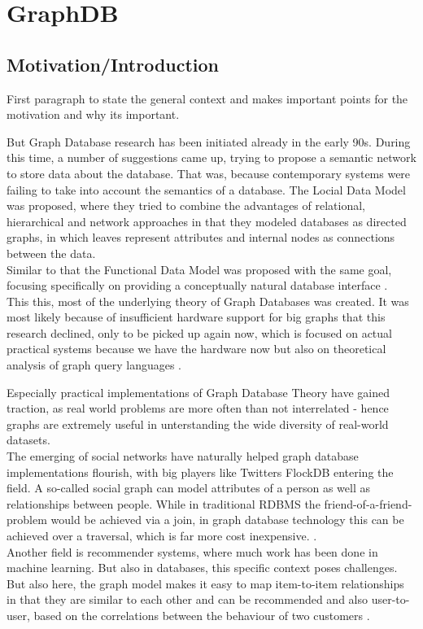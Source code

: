 \chapter{GraphDB}

\section{Motivation/Introduction}
First paragraph to state the general context and makes important points for the motivation and why its important.

But Graph Database research has been initiated already in the early 90s. During this time, a number of suggestions came up, trying to  propose a semantic network to store data about the database. That was, because contemporary systems were failing to take into account the semantics of a database.
The Locial Data Model \cite{KUPERLDM} was proposed, where they tried to combine the advantages of relational, hierarchical and network approaches in that they modeled databases as directed graphs, in which leaves represent attributes and internal nodes as connections between the data. \\
Similar to that the Functional Data Model \cite{Shipman1979} was proposed with the same goal, focusing specifically on providing a conceptually natural database interface \cite{Angles2018AnIT}. \\
This this, most of the underlying theory of Graph Databases was created.
It was most likely because of insufficient hardware support for big graphs that this research declined, only to be picked up again now, which is focused on actual practical systems because we have the hardware now but also on theoretical analysis of graph query languages \cite{Angles2018AnIT}.

Especially practical implementations of Graph Database Theory have gained traction, as real world problems are more often than not interrelated - hence graphs are extremely useful in unterstanding the wide diversity of real-world datasets.\cite{Robinson2013} \\
The emerging of social networks have naturally helped graph database implementations flourish, with big players like Twitters FlockDB entering the field. A so-called social graph can model attributes of a person as well as relationships between people. While in traditional RDBMS the friend-of-a-friend-problem would be achieved via a join, in graph database technology this can be achieved over a traversal, which is far more cost inexpensive. \cite{Miller2013GraphDA}. \\
Another field is recommender systems, where much work has been done in machine learning. But also in databases, this specific context poses challenges. But also here, the graph model makes it easy to map item-to-item relationships in that they are similar to each other and can be recommended and also user-to-user, based on the correlations between the behaviour of two customers \cite{Huang2002}.

